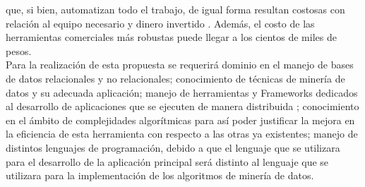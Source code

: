 que, si bien, automatizan todo el trabajo, de igual forma resultan costosas con relación al equipo necesario y dinero invertido \cite{refi6}.
Además, el costo de las herramientas comerciales más robustas puede llegar a los cientos de miles de pesos.
\\
Para la realización de esta propuesta se requerirá dominio en el manejo de bases de datos relacionales y no relacionales;
conocimiento de técnicas de minería de datos y su adecuada aplicación; manejo de herramientas y Frameworks dedicados al
desarrollo de aplicaciones que se ejecuten de manera distribuida \cite{refi10}; conocimiento en el ámbito de complejidades algorítmicas
para así poder justificar la mejora en la eficiencia de esta herramienta con respecto a las otras ya existentes; manejo de distintos
lenguajes de programación, debido a que el lenguaje que se utilizara para el desarrollo de la aplicación principal será distinto al
lenguaje que se utilizara para la implementación de los algoritmos de minería de datos.
